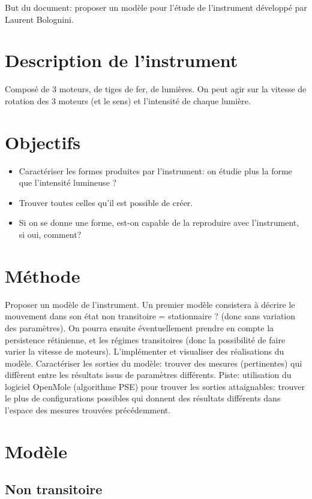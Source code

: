 \documentclass[11pt,a4paper]{article}
\begin{document}
But du document: proposer un modèle pour l'étude de l'instrument développé par Laurent Bolognini.

\section{Description de l'instrument}
Composé de 3 moteurs, de tiges de fer, de lumières.
On peut agir sur la vitesse de rotation des 3 moteurs (et le sens) et l'intensité de chaque lumière.


\section{Objectifs}
\begin{itemize}
\item Caractériser les formes produites par l'instrument: on étudie plus la forme que l'intensité lumineuse ?
\item Trouver toutes celles qu'il est possible de créer.
\item Si on se donne une forme, est-on capable de la reproduire avec l'instrument, si oui, comment?
\end{itemize}

\section{Méthode}
Proposer un modèle de l'instrument. Un premier modèle consistera à décrire le mouvement dans son état non transitoire = stationnaire ? (donc sans variation des paramètres).
On pourra ensuite éventuellement prendre en compte la persistence rétinienne, et les régimes transitoires (donc la possibilité de faire varier la vitesse de moteurs).
L'implémenter et visualiser des réalisations du modèle.
Caractériser les sorties du modèle: trouver des mesures (pertinentes) qui diffèrent entre les résultats issus de paramètres différents.
Piste: utilisation du logiciel OpenMole (algorithme PSE) pour trouver les sorties attaignables: trouver le plus de configurations possibles qui donnent des résultats différents dans l'espace des mesures trouvées précédemment.


\section{Modèle}

\subsection{Non transitoire}
\end{document}
